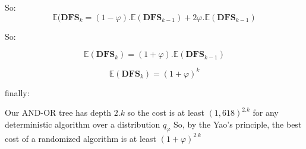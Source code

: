 \documentclass[12pt,a4paper]{article}
\begin{document}
So:
$$\mathbb{E}(\textbf{DFS}_{k}=(1-\varphi).\mathbb{E}(\textbf{DFS}_{k-1})+2\varphi.\mathbb{E}(\textbf{DFS}_{k-1})$$

So:

$$\mathbb{E}(\textbf{DFS}_{k})=(1+\varphi).\mathbb{E}(\textbf{DFS}_{k-1})$$

$$\mathbb{E}(\textbf{DFS}_{k})=(1+\varphi)^{k}$$

finally:

Our AND-OR tree has depth $2.k$ so the cost is at least $(1,618)^{2.k}$ for any deterministic algorithm over a distribution $q_{\varphi}$
So, by the Yao's principle, the best cost of a randomized algorithm is at least $(1+\varphi)^{2.k}$

\flushright{$\square$}
\flushleft
\end{document}
